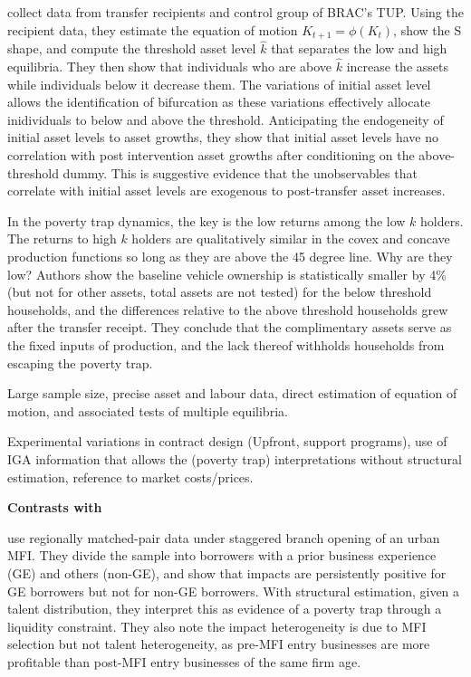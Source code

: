 	\citet{Balboni2020} collect data from transfer recipients and control group of BRAC's TUP. Using the recipient data, they estimate the equation of motion $K_{t+1}=\phi(K_{t})$, show the S shape, and compute the threshold asset level $\hat{k}$ that separates the low and high equilibria. They then show that individuals who are above $\hat{k}$ increase the assets while individuals below it decrease them. The variations of initial asset level allows the identification of bifurcation as these variations effectively allocate inidividuals to below and above the threshold. Anticipating the endogeneity of initial asset levels to asset growths, they show that initial asset levels have no correlation with post intervention asset growths after conditioning on the above-threshold dummy. This is suggestive evidence that the unobservables that correlate with initial asset levels are exogenous to post-transfer asset increases.

	In the poverty trap dynamics, the key is the low returns among the low $k$ holders. The returns to high $k$ holders are qualitatively similar in the covex and concave production functions so long as they are above the 45 degree line. Why are they low? Authors show the baseline vehicle ownership is statistically smaller by 4\% (but not for other assets, total assets are not tested) for the below threshold households, and the differences relative to the above threshold households grew after the transfer receipt. They conclude that the complimentary assets serve as the fixed inputs of production, and the lack thereof withholds households from escaping the poverty trap.

\begin{description}
\vspace{1.0ex}\setlength{\itemsep}{1.0ex}\setlength{\baselineskip}{12pt}
\item[their strength]	Large sample size, precise asset and labour data, direct estimation of equation of motion, and associated tests of multiple equilibria.
\item[our strength]	Experimental variations in contract design (\textsf{Upfront}, support programs), use of IGA information that allows the (poverty trap) interpretations without structural estimation, reference to market costs/prices. 
\end{description}

\noindent
\textbf{\textbf{Contrasts with \citet{Banerjee2019MFPovertyTrap}}}

	\citet{Banerjee2019MFPovertyTrap} use regionally matched-pair data under staggered branch opening of an urban MFI. They divide the sample into borrowers with a prior business experience (GE) and others (non-GE), and show that impacts are persistently positive for GE borrowers but not for non-GE borrowers. With structural estimation, given a talent distribution, they interpret this as evidence of a poverty trap through a liquidity constraint. They also note the impact heterogeneity is due to MFI selection but not talent heterogeneity, as pre-MFI entry businesses are more profitable than post-MFI entry businesses of the same firm age. 

